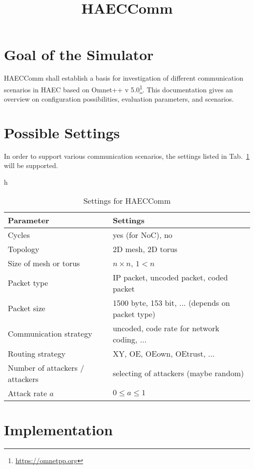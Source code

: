 \documentclass[12pt]{article}
\begin{document}
\title{HAECComm}
\author{}
\maketitle

\section{Goal of the Simulator}
HAECComm shall establish a basis for investigation of different communication scenarios in HAEC based on Omnet++ v 5.0\footnote{\url{https://omnetpp.org}}. This documentation gives an overview on configuration possibilities, evaluation parameters, and scenarios.

\section{Possible Settings}
\label{sec:settings}

In order to support various communication scenarios, the settings listed in Tab.~\ref{tab_settings} will be supported. 

\begin{table}{h}
	\caption{\label{tab_settings}Settings for HAECComm}
  \begin{tabular}{|l|l|}

	\hline 
	Parameter&Settings  \\ 
	\hline \hline
	Cycles&yes (for NoC), no  \\ 
	\hline 
	Topology& 2D mesh, 2D torus \\ 
	\hline 
	Size of mesh or torus&$n \times n$, $1 < n$  \\ 
	\hline 
	Packet type&IP packet, uncoded packet, coded packet\\ 
	\hline 
	Packet size&1500 byte, 153 bit, ... (depends on packet type)  \\ 
	\hline 
	Communication strategy&uncoded, code rate for network coding, ...\\ 
	\hline 
	Routing strategy&XY, OE, OEown, OEtrust, ...  \\ 
	\hline 
	Number of attackers / attackers&selecting of attackers (maybe random)   \\ 
	\hline 
	Attack rate $a$&$0 \le a \le 1$  \\ 
	\hline 
  \end{tabular} 
\end{table}



\section{Implementation}
\end{document}
